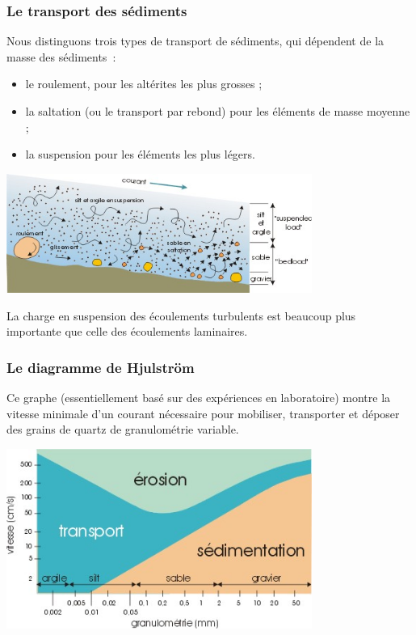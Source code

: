 \documentclass[a4paper,11pt]{article}
\begin{document}
\subsubsection{Le transport des sédiments}

Nous distinguons trois types de transport de sédiments, qui dépendent de la masse des sédiments~:
\begin{itemize}
  \item le roulement, pour les altérites les plus grosses ;
  \item la saltation (ou le transport par rebond) pour les éléments de masse moyenne ;
  \item la suspension pour les éléments les plus légers.
\end{itemize}

\begin{center}
  \includegraphics[width=10cm]{Images/transport_0.png}
\end{center}

La charge en suspension des écoulements turbulents est beaucoup plus importante que celle des écoulements laminaires.

\subsubsection{Le diagramme de Hjulström}
Ce graphe (essentiellement basé sur des expériences en laboratoire) montre la vitesse minimale d'un courant nécessaire pour mobiliser, transporter et déposer des grains de quartz de granulométrie variable.

\begin{center}
  \includegraphics[width=10cm]{Images/transport_1.png}
\end{center}
\end{document}
